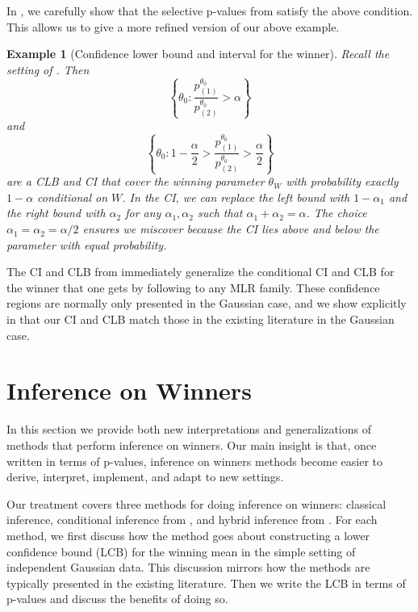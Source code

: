 \documentclass{article}
\newtheorem{example}{Example}
\begin{document}
In , we carefully show that the selective p-values from  satisfy the above condition. This allows us to give a more refined version of our above example. 

\begin{example}[Confidence lower bound and interval for the winner] 
    \label{exm:confidence_interval}
    Recall the setting of . Then 
    \begin{equation*}
        \left\{ \theta_0 : \frac{p^{\theta_0}_{(1)}}{p^{\theta_0}_{(2)}} > \alpha \right\}
    \end{equation*}
    and 
    \begin{equation*}
        \left\{ \theta_0 : 1 - \frac{\alpha}{2}> \frac{p^{\theta_0}_{(1)}}{p^{\theta_0}_{(2)}} > \frac{\alpha}{2} \right\}
    \end{equation*}
    are a CLB and CI that cover the winning parameter  $\theta_W$ with probability exactly $1-\alpha$ conditional on $W$. In the CI, we can replace the left bound with $1-\alpha_1$ and the right bound with $\alpha_2$ for any $\alpha_1, \alpha_2 $ such that $\alpha_1 + \alpha_2 = \alpha$. The choice $\alpha_1 = \alpha_2 = \alpha/2$ ensures we miscover because the CI lies above and below the parameter with equal probability. 
\end{example}

The CI and CLB from  immediately generalize the conditional CI and CLB for the winner that one gets by following \cite{Fithian2017} to any MLR family. These confidence regions are normally only presented in the Gaussian case, and we show explicitly in  that our CI and CLB match those in the existing literature in the Gaussian case. 

\section{Inference on Winners}
\label{sec:winner}

In this section we provide both new interpretations and generalizations of methods that perform inference on winners. Our main insight is that, once written in terms of p-values, inference on winners methods become easier to derive, interpret, implement, and adapt to new settings. 

Our treatment covers three methods for doing inference on winners: classical inference, conditional inference from \cite{Fithian2017}, and hybrid inference from \cite{Andrews2023}. For each method, we first discuss how the method goes about constructing a lower confidence bound (LCB) for the winning mean in the simple setting of independent Gaussian data. This discussion mirrors how the methods are typically presented in the existing literature. Then we write the LCB in terms of p-values and discuss the benefits of doing so. %
\end{document}
